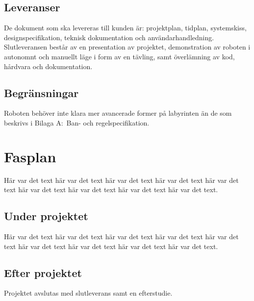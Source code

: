 \documentclass[a4paper,titlepage,12pt]{article}
\begin{document}
	
	
	\subsection{Leveranser}
	De dokument som ska levereras till kunden är: projektplan, tidplan,
    systemskiss, designspecifikation, teknisk dokumentation och
    användarhandledning. Slutleveransen består av en presentation av projektet,
    demonstration av roboten i autonomnt och manuellt läge i form av en tävling,
    samt överlämning av kod, hårdvara och dokumentation.
	
	
	\subsection{Begränsningar}
	Roboten behöver inte klara mer avancerade former på labyrinten än de som
    beskrivs i Bilaga A:\ Ban- och regelspecifikation.
	
	
	\section{Fasplan}
	Här var det text här var det text här var det text
	här var det text här var det text här var det text
	här var det text här var det text här var det text.
	
	
	
	\subsection{Under projektet}
	Här var det text här var det text här var det text
	här var det text här var det text här var det text
	här var det text här var det text här var det text.
	
	
	\subsection{Efter projektet}
    Projektet avslutas med slutleverans samt en efterstudie.
	
\end{document}

